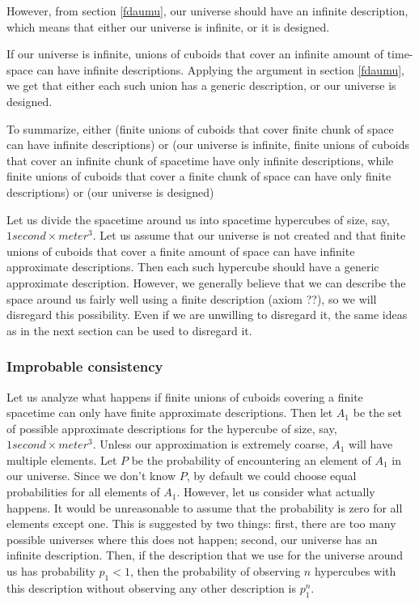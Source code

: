 \documentclass[a4paper
,draft
]{article}
\newcommand{\svn}[2][]{\todo[author=Virgil,color=red!25!white,#1]{#2}}
\begin{document}
However, from section \ref{fdaumu}, our universe should have an
infinite description, which means that either our universe is infinite,
or it is designed.

If our universe is infinite, unions of cuboids that cover an infinite
amount of time-space can have infinite descriptions. Applying the argument
in section \ref{fdaumu}, we get that either each such union has a generic
description, or our universe is designed.

To summarize, either (finite unions of cuboids that cover finite chunk of space
can have infinite descriptions) or (our universe is infinite, finite unions of
cuboids that cover an infinite chunk of spacetime have only infinite
descriptions, while finite unions of cuboids that cover a finite chunk of
space can have only finite descriptions) or (our universe is designed)

Let us divide the spacetime around us into spacetime hypercubes of size, say,
$1 second \times meter^3$. Let us assume that our universe is not created
and that finite unions of cuboids that cover a finite amount of space
can have infinite approximate descriptions. Then each such hypercube should
have a generic approximate description. However, we generally believe that
we can describe the space around us fairly well using a finite description
(axiom ??), so we will disregard this possibility. Even if we are unwilling
to disregard it, the same ideas as in the next section can be used to
disregard it.

\subsubsection{Improbable consistency}

Let us analyze what happens if finite unions of cuboids covering a finite
spacetime can only have finite approximate descriptions.
Then let $A_1$ be the set of possible approximate descriptions for
the hypercube of size, say, $1 second \times meter^3$.
Unless our approximation is extremely coarse, $A_1$ will have multiple elements.
Let $P$ be the probability of encountering an element of $A_1$ in our universe.
Since we don't know $P$, by default we could choose equal probabilities for
all elements of $A_1$. However, let us consider what actually happens.
\svn{why is there a probability?}
It would be unreasonable to assume that the probability is zero for all
elements except one. This is suggested by two things: first, there are too many
possible universes where this does not happen; second, our universe has an
infinite description.
\svn{can I prove this?}
Then, if the description that we use for the universe around us
has probability $p_1 < 1$, then the probability of observing $n$ hypercubes
with this description without observing any other description is $p_1^n$.
\end{document}
